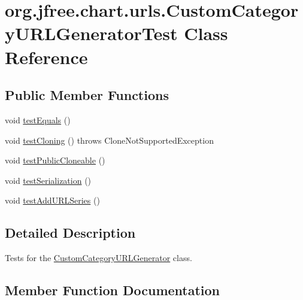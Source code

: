 \hypertarget{classorg_1_1jfree_1_1chart_1_1urls_1_1_custom_category_u_r_l_generator_test}{}\section{org.\+jfree.\+chart.\+urls.\+Custom\+Category\+U\+R\+L\+Generator\+Test Class Reference}
\label{classorg_1_1jfree_1_1chart_1_1urls_1_1_custom_category_u_r_l_generator_test}
\subsection*{Public Member Functions}
\begin{DoxyCompactItemize}
\item 
void \mbox{\hyperlink{classorg_1_1jfree_1_1chart_1_1urls_1_1_custom_category_u_r_l_generator_test_a48cb1fad485bbf6718223ac85c6febb8}{test\+Equals}} ()
\item 
void \mbox{\hyperlink{classorg_1_1jfree_1_1chart_1_1urls_1_1_custom_category_u_r_l_generator_test_a5515c144dceaa1447eeae9bff20a28b9}{test\+Cloning}} ()  throws Clone\+Not\+Supported\+Exception 
\item 
void \mbox{\hyperlink{classorg_1_1jfree_1_1chart_1_1urls_1_1_custom_category_u_r_l_generator_test_a9573211347f5a6161493940a97eee9a0}{test\+Public\+Cloneable}} ()
\item 
void \mbox{\hyperlink{classorg_1_1jfree_1_1chart_1_1urls_1_1_custom_category_u_r_l_generator_test_a8b906bc045581614bf111868c8456cd7}{test\+Serialization}} ()
\item 
void \mbox{\hyperlink{classorg_1_1jfree_1_1chart_1_1urls_1_1_custom_category_u_r_l_generator_test_a81c98e1b4043f6e0a0fb43f3e0efa2d8}{test\+Add\+U\+R\+L\+Series}} ()
\end{DoxyCompactItemize}


\subsection{Detailed Description}
Tests for the \mbox{\hyperlink{classorg_1_1jfree_1_1chart_1_1urls_1_1_custom_category_u_r_l_generator}{Custom\+Category\+U\+R\+L\+Generator}} class. 

\subsection{Member Function Documentation}
\mbox{\label{classorg_1_1jfree_1_1chart_1_1urls_1_1_custom_category_u_r_l_generator_test_a81c98e1b4043f6e0a0fb43f3e0efa2d8}} 
